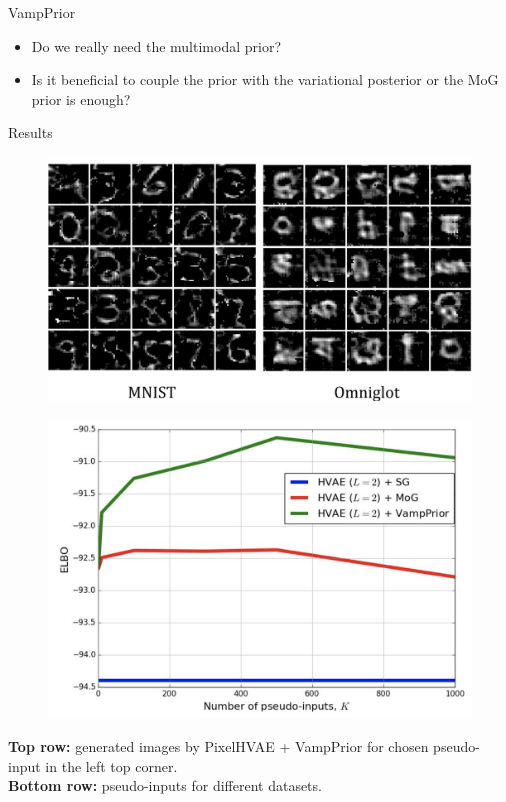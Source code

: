 \documentclass{beamer}
\begin{document}
\begin{frame}{VampPrior}
	\begin{itemize}
	\item Do we really need the multimodal prior?
	\item Is it beneficial to couple the prior with the variational posterior or the MoG prior is enough?
	\end{itemize}
	\begin{block}{Results}
		\vspace{-0.3cm}
		\begin{minipage}[t]{0.55\columnwidth}
			\begin{figure}[h]
				\centering
				\includegraphics[width=1.0\linewidth]{figs/VampPrior_1.png}
			\end{figure}
		\end{minipage}%
		\begin{minipage}[t]{0.45\columnwidth}
			\begin{figure}[h]
				\centering
				\includegraphics[width=1.0\linewidth]{figs/VampPrior_2.png}
			\end{figure}
		\end{minipage}
	\end{block}
	\textbf{Top row:} generated images by PixelHVAE + VampPrior for chosen pseudo-input in the left top corner. \\
	\vspace{0.1cm}
	\textbf{Bottom row:} pseudo-inputs for different datasets.
\end{frame}
\end{document}
